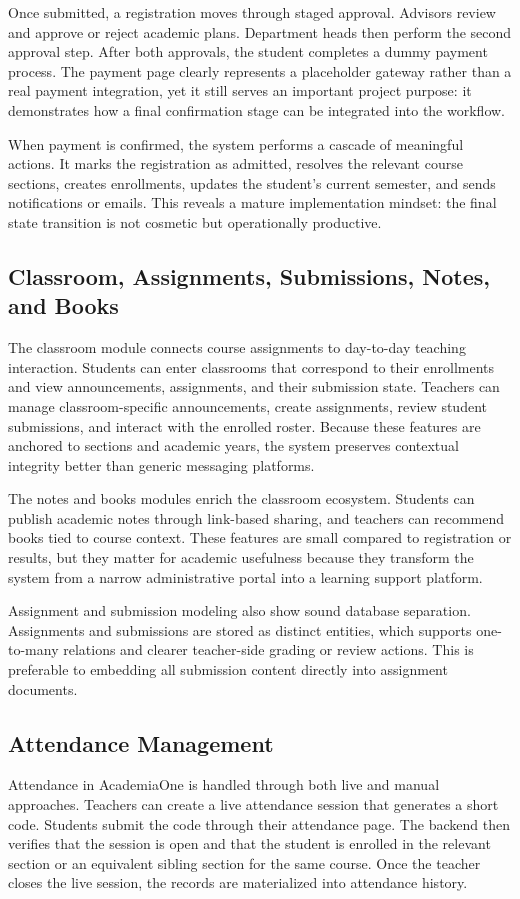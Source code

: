 \documentclass[12pt,a4paper]{report}
\newcommand{\systemName}{AcademiaOne}
\begin{document}
Once submitted, a registration moves through staged approval. Advisors review and approve or reject academic plans. Department heads then perform the second approval step. After both approvals, the student completes a dummy payment process. The payment page clearly represents a placeholder gateway rather than a real payment integration, yet it still serves an important project purpose: it demonstrates how a final confirmation stage can be integrated into the workflow.

When payment is confirmed, the system performs a cascade of meaningful actions. It marks the registration as admitted, resolves the relevant course sections, creates enrollments, updates the student's current semester, and sends notifications or emails. This reveals a mature implementation mindset: the final state transition is not cosmetic but operationally productive.

\subsection{Classroom, Assignments, Submissions, Notes, and Books}
The classroom module connects course assignments to day-to-day teaching interaction. Students can enter classrooms that correspond to their enrollments and view announcements, assignments, and their submission state. Teachers can manage classroom-specific announcements, create assignments, review student submissions, and interact with the enrolled roster. Because these features are anchored to sections and academic years, the system preserves contextual integrity better than generic messaging platforms.

The notes and books modules enrich the classroom ecosystem. Students can publish academic notes through link-based sharing, and teachers can recommend books tied to course context. These features are small compared to registration or results, but they matter for academic usefulness because they transform the system from a narrow administrative portal into a learning support platform.

Assignment and submission modeling also show sound database separation. Assignments and submissions are stored as distinct entities, which supports one-to-many relations and clearer teacher-side grading or review actions. This is preferable to embedding all submission content directly into assignment documents.

\subsection{Attendance Management}
Attendance in \systemName{} is handled through both live and manual approaches. Teachers can create a live attendance session that generates a short code. Students submit the code through their attendance page. The backend then verifies that the session is open and that the student is enrolled in the relevant section or an equivalent sibling section for the same course. Once the teacher closes the live session, the records are materialized into attendance history.
\end{document}
